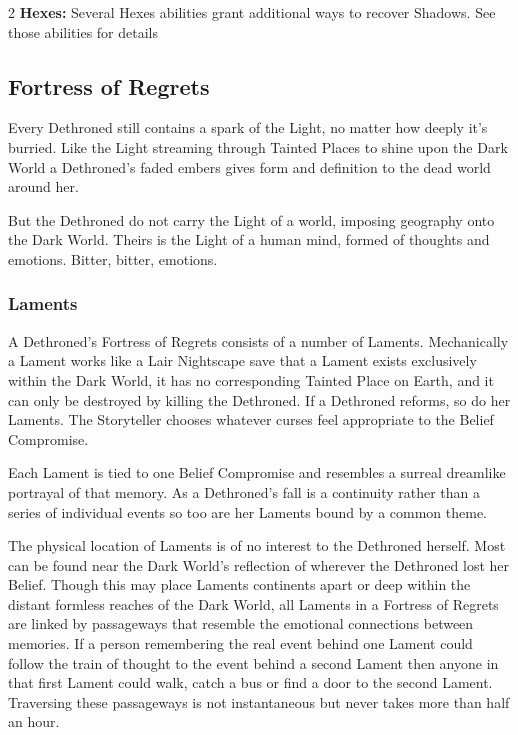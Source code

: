 \begin{multicols}{2}
\noindent \textbf{Hexes:} Several Hexes abilities grant additional ways to recover Shadows. See those abilities for details 

\subsection*{Fortress of Regrets}

Every Dethroned still contains a spark of the Light, no matter how deeply it's burried. Like the Light streaming through Tainted Places to shine upon the Dark World a Dethroned's faded embers gives form and definition to the dead world around her.

But the Dethroned do not carry the Light of a world, imposing geography onto the Dark World. Theirs is the Light of a human mind, formed of thoughts and emotions. Bitter, bitter, emotions.

\subsubsection*{Laments}

A Dethroned's Fortress of Regrets consists of a number of Laments. Mechanically a Lament works like a Lair Nightscape save that a Lament exists exclusively within the Dark World, it has no corresponding Tainted Place on Earth, and it can only be destroyed by killing the Dethroned. If a Dethroned reforms, so do her Laments. The Storyteller chooses whatever curses feel appropriate to the Belief Compromise.

Each Lament is tied to one Belief Compromise and resembles a surreal dreamlike portrayal of that memory. As a Dethroned's fall is a continuity rather than a series of individual events so too are her Laments bound by a common theme.

The physical location of Laments is of no interest to the Dethroned herself. Most can be found near the Dark World's reflection of wherever the Dethroned lost her Belief. Though this may place Laments continents apart or deep within the distant formless reaches of the Dark World, all Laments in a Fortress of Regrets are linked by passageways that resemble the emotional connections between memories. If a person remembering the real event behind one Lament could follow the train of thought to the event behind a second Lament then anyone in that first Lament could walk, catch a bus or find a door to the second Lament. Traversing these passageways is not instantaneous but never takes more than half an hour. 


\end{multicols}

